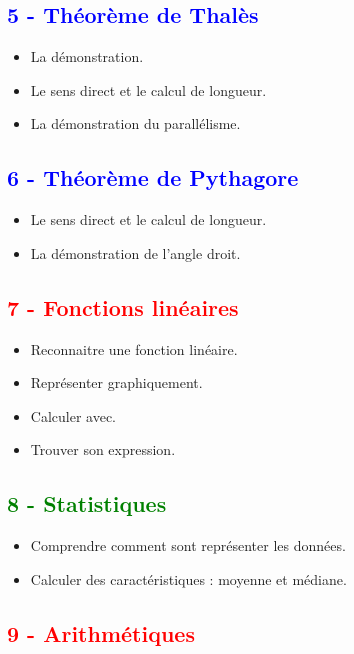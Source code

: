 \documentclass[11pt]{article}
\begin{document}
\begin{multicols}{2}
\subsection*{\textcolor{blue}{5 - Théorème de Thalès}}

\begin{itemize}
\item La démonstration.
\item Le sens direct et le calcul de longueur.
\item La démonstration du parallélisme.
\end{itemize}


\subsection*{\textcolor{blue}{6 - Théorème de Pythagore}}

\begin{itemize}
\item Le sens direct et le calcul de longueur.
\item La démonstration de l'angle droit.
\end{itemize}

\subsection*{\textcolor{red}{7 - Fonctions linéaires}}

\begin{itemize}
\item Reconnaitre une fonction linéaire.
\item Représenter graphiquement. 
\item Calculer avec.
\item Trouver son expression.
\end{itemize}

\subsection*{\textcolor{green}{8 - Statistiques}}

\begin{itemize}
\item Comprendre comment sont représenter les données.
\item Calculer des caractéristiques : moyenne et médiane.
\end{itemize}

\subsection*{\textcolor{red}{9 - Arithmétiques}}


\end{multicols}
\end{document}
